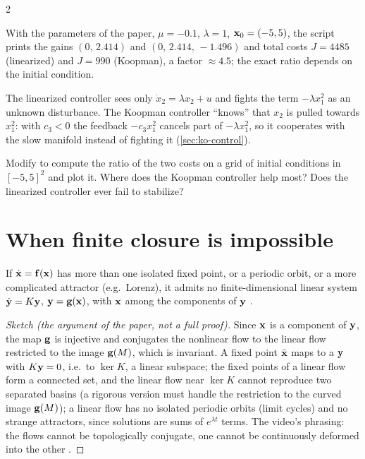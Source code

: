 \begin{paracol}{2}

With the parameters of the paper, $\mu=-0.1$, $\lambda=1$, $\mathbf{x}_0=(-5,5)$, the script prints the gains
$(0,\,2.414)$ and $(0,\,2.414,\,-1.496)$ and total costs $J=4485$ (linearized) and $J=990$ (Koopman), a factor
$\approx4.5$; the exact ratio depends on the initial condition.

\begin{intuition}
The linearized controller sees only $\dot x_2=\lambda x_2+u$ and fights the term $-\lambda x_1^2$ as an unknown
disturbance. The Koopman controller ``knows'' that $x_2$ is pulled towards $x_1^2$: with $c_3<0$ the feedback
$-c_3x_1^2$ cancels part of $-\lambda x_1^2$, so it cooperates with the slow manifold instead of fighting it
(\cref{sec:ko-control}).
\end{intuition}

\begin{exercise}
Modify  to compute the ratio of the two costs on a grid of initial conditions in
$[-5,5]^2$ and plot it. Where does the Koopman controller help most? Does the linearized controller ever fail to
stabilize?
\end{exercise}

\section{When finite closure is impossible}\label{sec:kc-limits}

\begin{proposition}\label{prop:kc-topology}
If $\dot{\mathbf{x}}=\mathbf{f}(\mathbf{x})$ has more than one isolated fixed point, or a periodic orbit, or a more complicated
attractor (e.g.\ Lorenz), it admits no finite-dimensional linear system $\dot{\mathbf{y}}=K\mathbf{y}$, $\mathbf{y}=\mathbf{g}(\mathbf{x})$,
with $\mathbf{x}$ among the components of $\mathbf{y}$ .
\end{proposition}
\begin{proof}[Sketch (the argument of the paper, not a full proof)]
Since $\mathbf{x}$ is a component of $\mathbf{y}$, the map $\mathbf{g}$ is injective and conjugates the nonlinear flow to the
linear flow restricted to the image $\mathbf{g}(M)$, which is invariant. A fixed point $\bar{\mathbf{x}}$ maps to a
$\mathbf{y}$ with $K\mathbf{y}=0$, i.e.\ to $\ker K$, a linear subspace; the fixed points of a linear flow form a connected
set, and the linear flow near $\ker K$ cannot reproduce two separated basins (a rigorous version must handle the
restriction to the curved image $\mathbf{g}(M)$); a linear flow has no isolated periodic orbits
(limit cycles) and no strange attractors, since solutions are sums of $e^{\lambda t}$ terms. The video's phrasing:
the flows cannot be topologically conjugate, one cannot be continuously deformed into the other
.
\end{proof}


\end{paracol}
